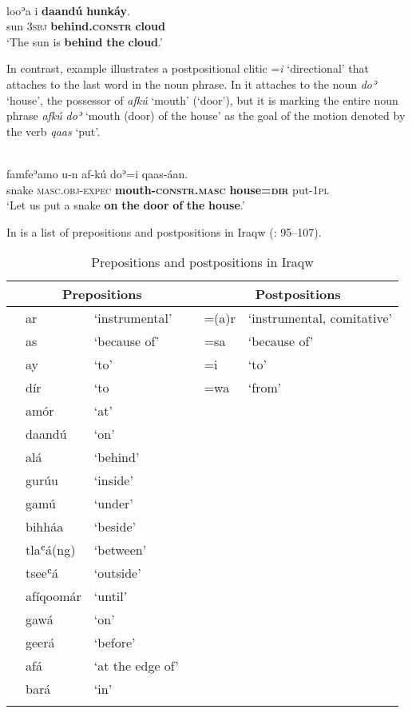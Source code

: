 \documentclass[output=paper]{langsci/langscibook}
\begin{document}
\ea\label{ex:dryer:30}
\\
\gll   looʾa  i  \textbf{daandú}  \textbf{hunkáy}.\\
       sun  3\textsc{sbj}  \textbf{behind.\textsc{constr}}  \textbf{cloud} \\
\glt ‘The sun is \textbf{behind} \textbf{the} \textbf{cloud}.’
\z

In contrast, example  illustrates a postpositional clitic =\textit{i} ‘directional’ that attaches to the last word in the noun phrase. In  it attaches to the noun \textit{doʾ} ‘house’, the possessor of \textit{afkú} ‘mouth’ (‘door’), but it is marking the entire noun phrase \textit{afkú} \textit{doʾ} ‘mouth (door) of the house’ as the goal of the motion denoted by the verb \textit{qaas} ‘put’.

\ea\label{ex:dryer:31}
\\
\gll famfeʾamo  u-n  af-kú  doʾ=i  qaas-áan.\\
       snake  \textsc{masc.obj-expec}  \textbf{mouth-\textsc{constr.masc}}  \textbf{house=\textsc{dir}}  put-\textsc{1pl}  \\
\glt ‘Let us put a snake \textbf{on} \textbf{the} \textbf{door} \textbf{of} \textbf{the} \textbf{house}.’
\z

In  is a list of prepositions and postpositions in Iraqw (\citealt{Mous1993}: 95–107).


\begin{table}
\caption{Prepositions and postpositions in Iraqw}
\label{extab:dryer:32}
\begin{tabularx}{\textwidth}{lll lll}
\lsptoprule
 & \multicolumn{2}{c}{\bfseries Prepositions} &  & \multicolumn{2}{c}{\bfseries Postpositions}\\
\midrule
 & ar & ‘instrumental’ &  & =(a)r & ‘instrumental, comitative’\\
 & as & ‘because of’ &  & =sa & ‘because of’\\
 & ay & ‘to’ &  & =i & ‘to’\\
 & dír & ‘to &  & =wa & ‘from’\\
 & amór & ‘at’ &  &  & \\
 & daandú & ‘on’ &  &  & \\
 & alá & ‘behind’ &  &  & \\
 & gurúu & ‘inside’ &  &  & \\
 & gamú & ‘under’ &  &  & \\
 & bihháa & ‘beside’ &  &  & \\
 & tlaʿá(ng) & ‘between’ &  &  & \\
 & tseeʿá & ‘outside’ &  &  & \\
 & afíqoomár & ‘until’ &  &  & \\
 & gawá & ‘on’ &  &  & \\
 & geerá & ‘before’ &  &  & \\
 & afá & ‘at the edge of’ &  &  & \\
 & bará & ‘in’ &  &  & \\
\lspbottomrule
\end{tabularx}
\end{table}
\end{document}
